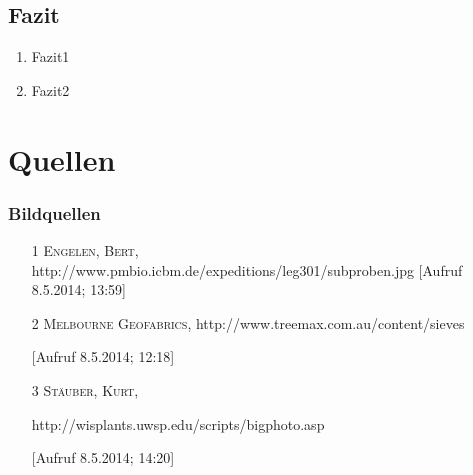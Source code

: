 \documentclass{beamer}
\begin{document}
\subsection{Fazit}
\begin{frame}
\begin{enumerate}
\item Fazit1
\item Fazit2
\end{enumerate}
\end{frame}

\section{Quellen}
\begin{frame}
\frametitle{Bildquellen}
\begin{itemize}
\item[1] \textsc{Engelen, Bert}, http://www.pmbio.icbm.de/expeditions/leg301/subproben.jpg 
[Aufruf 8.5.2014; 13:59]
\item[2] \textsc{Melbourne Geofabrics}, http://www.treemax.com.au/content/sieves 

[Aufruf 8.5.2014; 12:18]
\item[3]  \textsc{Stäuber, Kurt}, 

http://wisplants.uwsp.edu/scripts/bigphoto.asp 

[Aufruf 8.5.2014; 14:20]

\end{itemize}

\end{frame}
\end{document}

